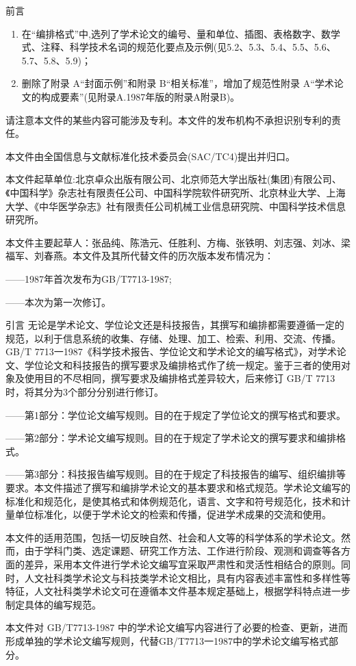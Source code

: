 \begin{preamble}{前言}
\begin{enumerate}[label={\alph*）}]
  \item  在“编排格式”中,选列了学术论文的编号、量和单位、插图、表格数字、数学式、注释、科学技术名词的规范化要点及示例(见5.2、5.3、5.4、5.5、5.6、5.7、5.8、5.9)；

  \item   删除了附录 A“封面示例”和附录 B“相关标准”，增加了规范性附录 A“学术论文的构成要素”(见附录A.1987年版的附录A附录B)。

\end{enumerate}

请注意本文件的某些内容可能涉及专利。本文件的发布机构不承担识别专利的责任。

本文件由全国信息与文献标准化技术委员会(SAC/TC4)提出并归口。

本文件起草单位:北京卓众出版有限公司、北京师范大学出版社(集团)有限公司、《中国科学》杂志社有限责任公司、中国科学院软件研究所、北京林业大学、上海大学、《中华医学杂志》社有限责任公司机械工业信息研究院、中国科学技术信息研究所。

本文件主要起草人：张品纯、陈浩元、任胜利、方梅、张铁明、刘志强、刘冰、梁福军、刘春燕。本文件及其所代替文件的历次版本发布情况为：

——1987年首次发布为GB/T7713-1987;

——本次为第一次修订。
\end{preamble}
\begin{preamble}{引言}
    无论是学术论文、学位论文还是科技报告，其撰写和编排都需要遵循一定的规范，以利于信息系统的收集、存储、处理、加工、检索、利用、交流、传播。GB/T 7713一1987《科学技术报告、学位论文和学术论文的编写格式》，对学术论文、学位论文和科技报告的撰写要求及编排格式作了统一规定。鉴于三者的使用对象及使用目的不尽相同，撰写要求及编排格式差异较大，后来修订 GB/T 7713 时，将其分为3个部分分别进行修订。

——第1部分：学位论文编写规则。目的在于规定了学位论文的撰写格式和要求。

——第2部分：学术论文编写规则。目的在于规定了学术论文的撰写要求和编排格式。

——第3部分：科技报告编写规则。目的在于规定了科技报告的编写、组织编排等要求。本文件描述了撰写和编排学术论文的基本要求和格式规范。学术论文编写的标准化和规范化，是使其格式和体例规范化，语言、文字和符号规范化，技术和计量单位标准化，以便于学术论文的检索和传播，促进学术成果的交流和使用。

本文件的适用范围，包括一切反映自然、社会和人文等的科学体系的学术论文。然而，由于学科门类、选定课题、研究工作方法、工作进行阶段、观测和调查等各方面的差异，采用本文件进行学术论文编写宜采取严肃性和灵活性相结合的原则。同时，人文社科类学术论文与科技类学术论文相比，具有内容表述丰富性和多样性等特征，人文社科类学术论文可在遵循本文件基本规定基础上，根据学科特点进一步制定具体的编写规范。

本文件对 GB/T7713-1987 中的学术论文编写内容进行了必要的检查、更新，进而形成单独的学术论文编写规则，代替GB/T7713一1987中的学术论文编写格式部分。
\end{preamble}
